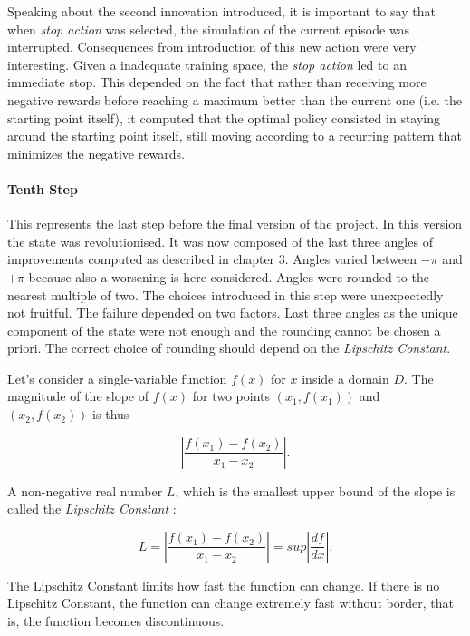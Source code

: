 Speaking about the second innovation introduced,  it is important to say that when \textit{stop action} was selected, the simulation of the current episode was interrupted. Consequences from introduction of this new action were very interesting. Given a inadequate training space, the \textit{stop action} led to an immediate stop. This depended on the fact that rather than receiving more negative rewards before reaching a maximum better than the current one (i.e. the starting point itself), it computed that the optimal policy consisted in staying around the starting point itself, still moving according to a recurring pattern that minimizes the negative rewards.

\paragraph{Tenth Step} This represents the last step before the final version of the project. In this version the state was revolutionised. It was now composed of the last three angles of improvements computed as described in chapter $3$. Angles varied between $- \pi$ and $+ \pi$ because also a worsening is here considered. Angles were rounded to the nearest multiple of two. The choices introduced in this step were unexpectedly not fruitful. The failure depended on two factors. Last three angles as the unique component of the state were not enough and the rounding cannot be chosen a priori. The correct choice of rounding should depend on the \textit{Lipschitz Constant}. 

Let's consider a single-variable function $f(x)$ for $x$ inside a domain $D$. The magnitude of the slope of $f(x)$ for two points $(x_1, f(x_1))$ and $(x_2, f(x_2))$ is thus 

\begin{equation}
	|\dfrac{f(x_1)-f(x_2)}{x_1 - x_2}|.
\end{equation}

A non-negative real number $L$, which is the smallest upper bound of the slope is called the \textit{Lipschitz Constant} :

\begin{equation}
L = |\dfrac{f(x_1)-f(x_2)}{x_1 - x_2}| = sup|\dfrac{df}{dx}|.
\end{equation}

The Lipschitz Constant limits how fast the function can change. If there is no Lipschitz Constant, the function can change extremely fast without border, that is, the function becomes discontinuous\cite{Lipschitz}.


